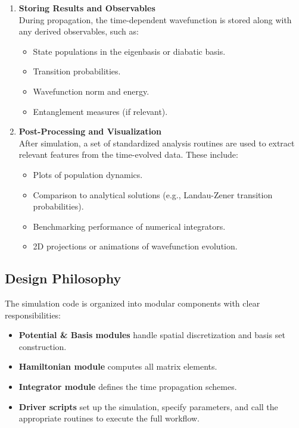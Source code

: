 \documentclass{subfiles}
\begin{document}
\begin{enumerate}
    \item \textbf{Storing Results and Observables} \\
    During propagation, the time-dependent wavefunction is stored along with any derived observables, such as:
    \begin{itemize}
        \item State populations in the eigenbasis or diabatic basis.
        \item Transition probabilities.
        \item Wavefunction norm and energy.
        \item Entanglement measures (if relevant).
    \end{itemize}

    \item \textbf{Post-Processing and Visualization} \\
    After simulation, a set of standardized analysis routines are used to extract relevant features from the time-evolved data. These include:
    \begin{itemize}
        \item Plots of population dynamics.
        \item Comparison to analytical solutions (e.g., Landau-Zener transition probabilities).
        \item Benchmarking performance of numerical integrators.
        \item 2D projections or animations of wavefunction evolution.
    \end{itemize}
\end{enumerate}

\subsection*{Design Philosophy}

The simulation code is organized into modular components with clear responsibilities:
\begin{itemize}
    \item \textbf{Potential \& Basis modules} handle spatial discretization and basis set construction.
    \item \textbf{Hamiltonian module} computes all matrix elements.
    \item \textbf{Integrator module} defines the time propagation schemes.
    \item \textbf{Driver scripts} set up the simulation, specify parameters, and call the appropriate routines to execute the full workflow.
\end{itemize}
\end{document}
